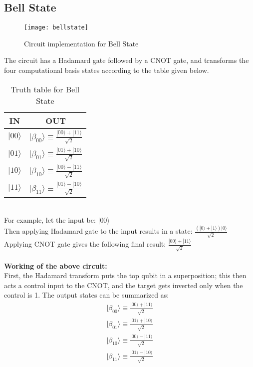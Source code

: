 \documentclass[12pt]{report}
\begin{document}
\subsection{Bell State}
\begin{figure}[h]
\centering
\texttt{[image: bellstate]}
\caption{Circuit implementation for Bell State}
\label{fig:bellstate}
\end{figure}
The circuit has a Hadamard gate followed by a CNOT gate, and transforms the four computational basis states according to the table given below. \\
\begin{table}[h!]
\centering
\begin{tabular}{|c|c|}
\hline
IN & OUT\\
\hline
$|00\rangle$ & $|\beta_{00}\rangle \equiv \frac{|00\rangle + |11\rangle}{\sqrt{2}}$\\
\hline
$|01\rangle$ & $|\beta_{01}\rangle \equiv \frac{|01\rangle + |10\rangle}{\sqrt{2}}$\\
\hline
$|10\rangle$ & $|\beta_{10}\rangle \equiv \frac{|00\rangle - |11\rangle}{\sqrt{2}}$\\
\hline
$|11\rangle$ & $|\beta_{11}\rangle \equiv \frac{|01\rangle - |10\rangle}{\sqrt{2}}$\\
\hline
\end{tabular}
\caption{Truth table for Bell State} 
\end{table} 
\\
For example, let the input be: $|00\rangle$ \\
Then applying Hadamard gate to the input results in a state:  $\frac{(|0\rangle + |1\rangle)|0\rangle}{\sqrt{2}}$\\
Applying CNOT gate gives the following final result:  $\frac{|00\rangle + |11\rangle}{\sqrt{2}}$\\
\\
\textbf{Working of the above circuit:}\\
First, the Hadamard transform puts the top qubit in a superposition; this then acts a control input to the CNOT, and the target gets inverted only when the control is 1. The output states can be summarized as: 
\begin{equation}
\begin{split}
|\beta_{00}\rangle \equiv \frac{|00\rangle + |11\rangle}{\sqrt{2}} \\
|\beta_{01}\rangle \equiv \frac{|01\rangle + |10\rangle}{\sqrt{2}} \\
|\beta_{10}\rangle \equiv \frac{|00\rangle - |11\rangle}{\sqrt{2}}  \\
|\beta_{11}\rangle \equiv \frac{|01\rangle - |10\rangle}{\sqrt{2}}
\end{split}
\end{equation}
\end{document}
